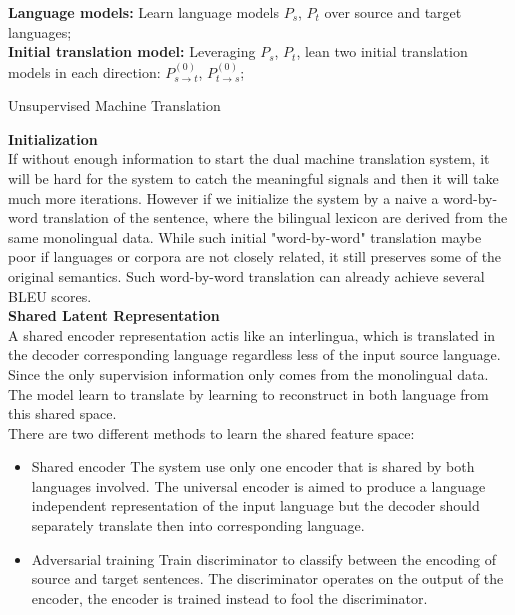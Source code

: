 \begin{algorithm}[H]
	\SetAlgoLined
	\textbf{Language models:} Learn language models $P_s$, $P_t$ over source and target languages;\\
	\textbf{Initial translation model:}  Leveraging $P_s$, $P_t$, lean two initial translation models in each direction: $P_{s\rightarrow t}^{(0)}$, ${P_{t \rightarrow s}^{(0)}}$;\\
	\caption{Unsupervised Machine Translation}
\end{algorithm}



\textbf{Initialization}\\
If without enough information to start the dual machine translation system, it will be hard for the system to catch the meaningful signals and then it will take much more iterations. However if we initialize the system by a naive a word-by-word translation of the sentence, where the bilingual lexicon are derived from the same monolingual data. While such initial "word-by-word" translation maybe poor if languages or corpora are not closely related, it still preserves some of the original semantics. Such word-by-word translation can already achieve several BLEU scores.\\

\textbf{Shared Latent Representation} \\
A shared encoder representation actis like an interlingua, which is translated in the decoder corresponding language regardless less of the input source language. Since the only supervision information only comes from the monolingual data. The model learn to translate by learning to reconstruct in both language from this shared space.\\
There are two different methods to learn the shared feature space:
\begin{itemize}
	\item Shared encoder
	The system use only one encoder that is shared by both languages involved. The universal encoder is aimed to produce a language independent representation of the input language but the decoder should separately translate then into corresponding language.
	\item Adversarial training
	Train discriminator to classify between the encoding of source and target sentences. The discriminator operates on the output of the encoder, the encoder is trained instead to fool the discriminator. 
\end{itemize}


